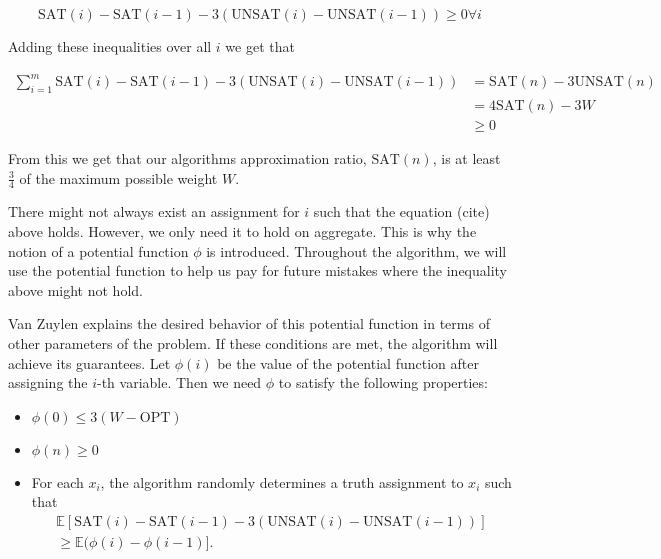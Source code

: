 \documentclass[11pt,letter]{article}
\begin{document}
\begin{equation}
\label{eq:1}
\text{SAT}(i)-\text{SAT}(i-1) - 3\left(\text{UNSAT}(i) - \text{UNSAT}(i-1)\right) \geq 0 \forall i
\end{equation}

Adding these inequalities over all $i$ we get that

\begin{equation*}
\begin{aligned}
\sum_{i = 1}^{m} \text{SAT}(i)-\text{SAT}(i-1) - 3\left(\text{UNSAT}(i) - \text{UNSAT}(i-1)\right)  & = \text{SAT}(n) - 3\text{UNSAT}(n) \\
& = 4\text{SAT}(n) - 3W \\
& \geq 0
\end{aligned}
\end{equation*}

From this we get that our algorithms approximation ratio, $\text{SAT}(n)$, is at least $\frac{3}{4}$ of the maximum possible weight $W$.

There might not always exist an assignment for $i$ such that the equation (cite) above holds. However, we only need it to hold on aggregate.
This is why the notion of a potential function $\phi$ is introduced. Throughout the algorithm, we will use the potential function to help us pay
for future mistakes where the inequality above might not hold.

Van Zuylen explains the desired behavior of this potential function in terms of other parameters of the problem. If these conditions are met, the algorithm
will achieve its guarantees. Let $\phi(i)$ be the value of the potential function after assigning the $i$-th variable. Then we need $\phi$ to satisfy the following properties:

\begin{itemize}
	\item $\phi(0) \leq 3(W-\text{OPT})$
	\item $\phi(n) \geq 0$
	\item For each $x_i$, the algorithm randomly determines a truth assignment to $x_i$ such that
\begin{equation}
\begin{aligned}
\label{eq:2}
\mathbb{E}[\text{SAT}(i) - \text{SAT}(i-1) - 3\left(\text{UNSAT}(i)-\text{UNSAT}(i-1)\right)] \\
\geq \mathbb{E}(\phi(i) - \phi(i-1)].
\end{aligned}
\end{equation}
\end{itemize}
\end{document}
